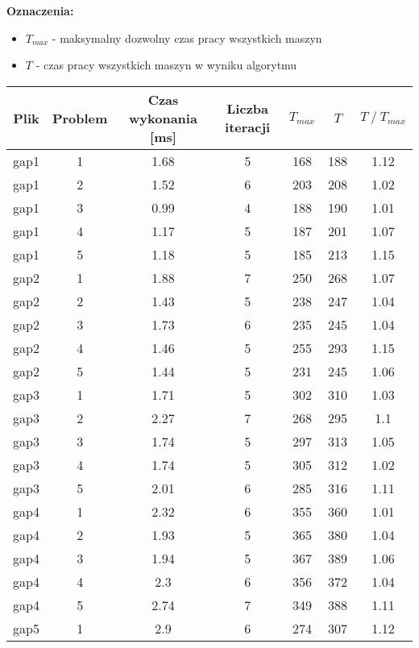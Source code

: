 \documentclass[12pt, a4paper]{article}
\begin{document}
\textbf{Oznaczenia:}

\begin{itemize}
  \item $T_{max}$ - maksymalny dozwolny czas pracy wszystkich maszyn
  \item $T$ - czas pracy wszystkich maszyn w wyniku algorytmu 
\end{itemize}

\begin{longtable}{|c|c|c|c|c|c|c|}
  \hline
  Plik & Problem & Czas wykonania [ms] & Liczba iteracji & $T_{max}$ & $T$ & $T \mathbin{/} T_{max}$ \\
  \hline
  gap1 & 1 & 1.68 & 5 & 168 & 188 & 1.12 \\
  \hline
  gap1 & 2 & 1.52 & 6 & 203 & 208 & 1.02 \\
  \hline
  gap1 & 3 & 0.99 & 4 & 188 & 190 & 1.01 \\
  \hline
  gap1 & 4 & 1.17 & 5 & 187 & 201 & 1.07 \\
  \hline
  gap1 & 5 & 1.18 & 5 & 185 & 213 & 1.15 \\
  \hline
  gap2 & 1 & 1.88 & 7 & 250 & 268 & 1.07 \\
  \hline
  gap2 & 2 & 1.43 & 5 & 238 & 247 & 1.04 \\
  \hline
  gap2 & 3 & 1.73 & 6 & 235 & 245 & 1.04 \\
  \hline
  gap2 & 4 & 1.46 & 5 & 255 & 293 & 1.15 \\
  \hline
  gap2 & 5 & 1.44 & 5 & 231 & 245 & 1.06 \\
  \hline
  gap3 & 1 & 1.71 & 5 & 302 & 310 & 1.03 \\
  \hline
  gap3 & 2 & 2.27 & 7 & 268 & 295 & 1.1 \\
  \hline
  gap3 & 3 & 1.74 & 5 & 297 & 313 & 1.05 \\
  \hline
  gap3 & 4 & 1.74 & 5 & 305 & 312 & 1.02 \\
  \hline
  gap3 & 5 & 2.01 & 6 & 285 & 316 & 1.11 \\
  \hline
  gap4 & 1 & 2.32 & 6 & 355 & 360 & 1.01 \\
  \hline
  gap4 & 2 & 1.93 & 5 & 365 & 380 & 1.04 \\
  \hline
  gap4 & 3 & 1.94 & 5 & 367 & 389 & 1.06 \\
  \hline
  gap4 & 4 & 2.3 & 6 & 356 & 372 & 1.04 \\
  \hline
  gap4 & 5 & 2.74 & 7 & 349 & 388 & 1.11 \\
  \hline
  gap5 & 1 & 2.9 & 6 & 274 & 307 & 1.12 \\

\end{longtable}
\end{document}
